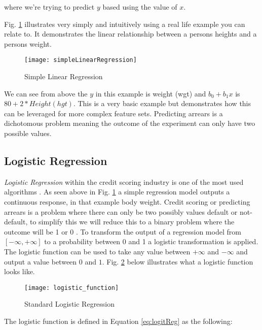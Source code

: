 where we're trying to predict $y$ based using the value of $x$.

Fig. \ref{fig:simpleLinearRegression} illustrates very simply and intuitively using a real life example you can relate to. It demonstrates the linear relationship between a persons heights and a persons weight.

\begin{figure}[H]
	\texttt{[image: simpleLinearRegression]}
	\caption[Confusion Matrix]
	{Simple Linear Regression}
	\label{fig:simpleLinearRegression}
\end{figure}

We can see from above the $y$ in this example is weight (wgt) and $b_0 + b_1x$ is $80 + 2*Height(hgt)$. This is a very basic example but demonstrates how this can be leveraged for more complex feature sets. Predicting arrears is a dichotomous problem meaning the outcome of the experiment can only have two possible values. 

\subsection{Logistic Regression} \label{LogReg}
\textit{Logistic Regression} \cite[See:][]{hosmer_applied_2000} within the credit scoring industry is one of the most used algorithms \citep{hand_evaluating_2010}. As seen above in Fig. \ref{fig:simpleLinearRegression} a simple regression model outputs a continuous response, in that example body weight. Credit scoring or predicting arrears is a problem where there can only be two possibly values default or not-default, to simplify this we will reduce this to a binary problem where the outcome will be 1 or 0 \citep{zou_modified_2004}. To transform the output of a regression model from $[-\infty, +\infty]$ to a probability between 0 and 1 a logistic transformation is applied. The logistic function can be used to take any value between $+\infty$ and $-\infty$ and output a value between $0$ and $1$. Fig. \ref{fig:logistic_function} below illustrates what a logistic function looks like.


\begin{figure}[H]
	\texttt{[image: logistic\_function]}
	\caption[Standard Logistic Regression]
	{Standard Logistic Regression}
	\label{fig:logistic_function}
\end{figure}

The logistic function is defined in Equation \ref{eq:logitReg} as the following: 

